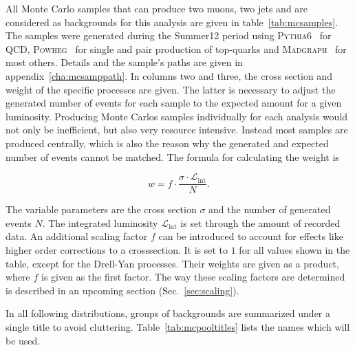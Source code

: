 All Monte Carlo samples that can produce two muons, two jets and are considered as backgrounds for this analysis are given in table~\ref{tab:mcsamples}. The samples were generated during the Summer12 period using \textsc{Pythia6}~\cite{pythia6} for QCD, \textsc{Powheg}~\cite{powheg,powhegst,powhegtt} for single and pair production of top-quarks and \textsc{Madgraph}~\cite{madgraph5} for most others. Details and the sample's paths are given in appendix~\ref{cha:mcsamppath}. In columns two and three, the cross section and weight of the specific processes are given. The latter is necessary to adjust the generated number of events for each sample to the expected amount for a given luminosity. Producing Monte Carlos samples individually for each analysis would not only be inefficient, but also very resource intensive. Instead most samples are produced centrally, which is also the reason why the generated and expected number of events cannot be matched. The formula for calculating the weight is

\begin{equation}
  \label{eq:weight}
  w = f \cdot \frac{\sigma \cdot \mathcal{L}_{\text{int}}}{N}.
\end{equation}

\noindent The variable parameters are the cross section $\sigma$ and the number of generated events $N$. The integrated luminosity $\mathcal{L}_{\text{int}}$ is set through the amount of recorded data. An additional scaling factor $f$ can be introduced to account for effects like higher order corrections to a crosssection. It is set to $1$ for all values shown in the table, except for the Drell-Yan processes. Their weights are given as a product, where $f$ is given as the first factor. The way these scaling factors are determined is described in an upcoming section (Sec.~\ref{sec:scaling}).

In all following distributions, groups of backgrounds are summarized under a single title to avoid cluttering. Table~\ref{tab:mcpooltitles} lists the names which will be used.

